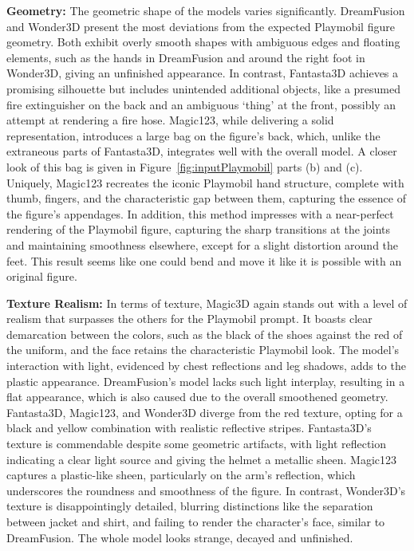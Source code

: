\textbf{Geometry:} The geometric shape of the models varies significantly. DreamFusion and Wonder3D present the most deviations from the expected Playmobil figure geometry. Both exhibit overly smooth shapes with ambiguous edges and floating elements, such as the hands in DreamFusion and around the right foot in Wonder3D, giving an unfinished appearance. In contrast, Fantasta3D achieves a promising silhouette but includes unintended additional objects, like a presumed fire extinguisher on the back and an ambiguous `thing' at the front, possibly an attempt at rendering a fire hose. Magic123, while delivering a solid representation, introduces a large bag on the figure's back, which, unlike the extraneous parts of Fantasta3D, integrates well with the overall model. A closer look of this bag is given in Figure~\ref{fig:inputPlaymobil} parts (b) and (c). Uniquely, Magic123 recreates the iconic Playmobil hand structure, complete with thumb, fingers, and the characteristic gap between them, capturing the essence of the figure's appendages. In addition, this method impresses with a near-perfect rendering of the Playmobil figure, capturing the sharp transitions at the joints and maintaining smoothness elsewhere, except for a slight distortion around the feet. This result seems like one could bend and move it like it is possible with an original figure.

\textbf{Texture Realism:} In terms of texture, Magic3D again stands out with a level of realism that surpasses the others for the Playmobil prompt. It boasts clear demarcation between the colors, such as the black of the shoes against the red of the uniform, and the face retains the characteristic Playmobil look. The model's interaction with light, evidenced by chest reflections and leg shadows, adds to the plastic appearance. DreamFusion's model lacks such light interplay, resulting in a flat appearance, which is also caused due to the overall smoothened geometry. Fantasta3D, Magic123, and Wonder3D diverge from the red texture, opting for a black and yellow combination with realistic reflective stripes. Fantasta3D's texture is commendable despite some geometric artifacts, with light reflection indicating a clear light source and giving the helmet a metallic sheen. Magic123 captures a plastic-like sheen, particularly on the arm's reflection, which underscores the roundness and smoothness of the figure. In contrast, Wonder3D's texture is disappointingly detailed, blurring distinctions like the separation between jacket and shirt, and failing to render the character's face, similar to DreamFusion. The whole model looks strange, decayed and unfinished.

